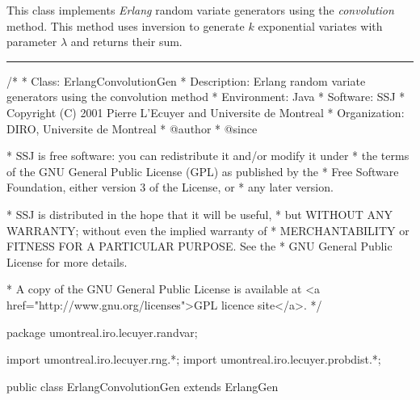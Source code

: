 
This class implements {\em Erlang\/} random variate generators using
the {\em convolution\/} method.  This method uses inversion to
generate $k$ exponential variates with parameter $\lambda$ and returns
their sum.


\bigskip\hrule

\begin{code}
\begin{hide}
/*
 * Class:        ErlangConvolutionGen
 * Description:  Erlang random variate generators using the convolution method
 * Environment:  Java
 * Software:     SSJ 
 * Copyright (C) 2001  Pierre L'Ecuyer and Universite de Montreal
 * Organization: DIRO, Universite de Montreal
 * @author       
 * @since

 * SSJ is free software: you can redistribute it and/or modify it under
 * the terms of the GNU General Public License (GPL) as published by the
 * Free Software Foundation, either version 3 of the License, or
 * any later version.

 * SSJ is distributed in the hope that it will be useful,
 * but WITHOUT ANY WARRANTY; without even the implied warranty of
 * MERCHANTABILITY or FITNESS FOR A PARTICULAR PURPOSE.  See the
 * GNU General Public License for more details.

 * A copy of the GNU General Public License is available at
   <a href="http://www.gnu.org/licenses">GPL licence site</a>.
 */
\end{hide}
package umontreal.iro.lecuyer.randvar;\begin{hide}
import umontreal.iro.lecuyer.rng.*;
import umontreal.iro.lecuyer.probdist.*;
\end{hide}

public class ErlangConvolutionGen extends ErlangGen \begin{hide} {
\end{hide}\end{code}

